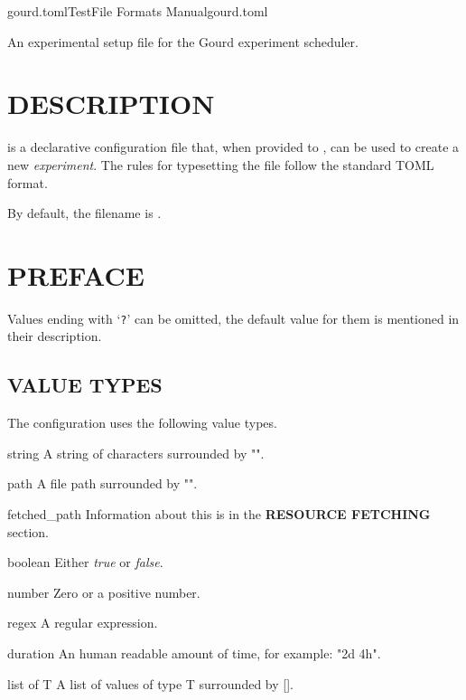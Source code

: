 \documentclass[a4paper,english]{article}
\begin{document}
  \pagestyle{fancy}

  \begin{Name}{5}{gourd.toml}{Test}{File Formats Manual}{gourd.toml}
\begin{adjustwidth}{18pt}{0pt}

       \- An experimental setup file for the Gourd experiment scheduler.

\end{adjustwidth}
  \end{Name}

\begin{adjustwidth}{18pt}{0pt}

  \section{DESCRIPTION}

       is a declarative configuration file that,
      when provided to , can be used to create a new \emph{experiment}.
      The rules for typesetting the file follow the standard TOML format.

      By default, the filename is .

  \section{PREFACE}

      Values ending with `\texttt{?}' can be omitted, the default value
      for them is mentioned in their description.

      \subsection{VALUE TYPES}
          The configuration uses the following value types.

          \begin{Description}[Types]\setlength{\itemsep}{0cm}
              \item[string] A string of characters surrounded by "".
              \item[path] A file path surrounded by "".
              \item[fetched\_path] Information about this is in the \textbf{RESOURCE FETCHING} section.
              \item[boolean] Either \emph{true} or \emph{false}.
              \item[number] Zero or a positive number.
              \item[regex] A regular expression.
              \item[duration] An human readable amount of time, for example: "2d 4h".
              \item[list of T] A list of values of type T surrounded by [].
          \end{Description}


\end{adjustwidth}
\end{document}
